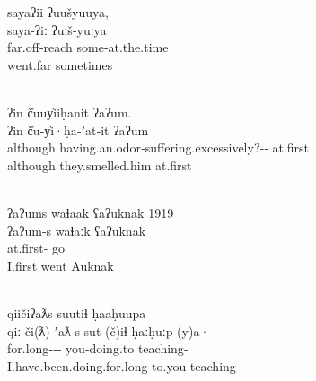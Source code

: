 \begin{exe}
  \ex\label{ex:3.17}
  \begin{xlist}

    \ex\label{ex:3.17a}
    \glllll sayaʔii       ʔuušyuuya,\\
            saya‑ʔiː      ʔuːš‑yuːya\\
            far.off‑reach some‑at.the.time\\
            went.far      sometimes\\
                 \\

    \clearpage

    \ex\label{ex:3.17b}
    \glllll ʔin      č̓uuy̓iiḥanit                                               ʔaʔum.\\
            ʔin      č̓u‑y̓i·ḥa‑ʼat‑it                                            ʔaʔum\\
            although having.an.odor‑suffering.excessively?‑‑ at.first\\
            although they.smelled.him                                          at.first\\
            { }                                                       \\

    \ex\label{ex:3.17c}
    \glllll ʔaʔums            waɬaak    ʕaʔuknak  1919\\
            ʔaʔum‑s           waɬaːk    ʕaʔuknak  { }\\
            at.first‑ go         { }\\
            I.first           went      Auknak    { }\\
                        { }\\

    \ex\label{ex:3.17d}
    \glllll qiičiʔaƛs                          suutiɬ       ḥaaḥuupa\\
            qiː‑či(ƛ)‑ʼaƛ‑s                     sut‑(č)iɬ    ḥaːḥuːp‑(y)a·\\
            for.long‑‑‑ you‑doing.to teaching‑\\
            I.have.been.doing.for.long         to.you       teaching\\
                                          \\

  \end{xlist}
\end{exe}

